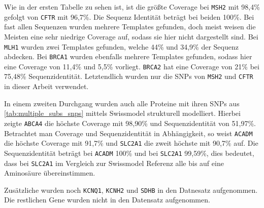 Wie in der ersten Tabelle zu sehen ist, ist die größte Coverage bei \texttt{MSH2} mit 98,4\% gefolgt von \texttt{CFTR} mit 96,7\%. Die Sequenz Identität beträgt bei beiden 100\%. Bei fast allen Sequenzen wurden mehrere Templates gefunden, doch meist weisen die Meisten eine sehr niedrige Coverage auf, sodass sie hier nicht dargestellt sind. Bei \texttt{MLH1} wurden zwei Templates gefunden, welche 44\% und 34,9\% der Sequenz abdecken. Bei \texttt{BRCA1} wurden ebenfalls mehrere Templates gefunden, sodass hier eine Coverage von 11,4\% und 5,5\% vorliegt. \texttt{BRCA2} hat eine Coverage von 21\% bei 75,48\% Sequenzidentität. Letztendlich wurden nur die \ac{SNP}s von \texttt{MSH2} und \texttt{CFTR} in dieser Arbeit verwendet.

In einem zweiten Durchgang wurden auch alle Proteine mit ihren SNPs aus \ref{tab:multiple_subs_snps} mittels Swissmodel strukturell modelliert. Hierbei zeigte \texttt{ABCA4} die höchste Coverage mit 98,90\% und Sequenzidentität von 51,97\%. Betrachtet man Coverage und Sequenzidentität in Abhängigkeit, so weist \texttt{ACADM} die höchste Coverage mit 91,7\% und \texttt{SLC2A1} die zweit höchste mit 90,7\% auf. Die Sequenzidentität beträgt bei \texttt{ACADM} 100\% und bei \texttt{SLC2A1} 99,59\%, dies bedeutet, dass bei \texttt{SLC2A1} im Vergleich zur Swissmodel Referenz alle bis auf eine Aminosäure übereinstimmen.

Zusätzliche wurden noch \texttt{KCNQ1}, \texttt{KCNH2} und \texttt{SDHB} in den Datnesatz aufgenommen. Die restlichen Gene wurden nicht in den Datensatz aufgenommen.

